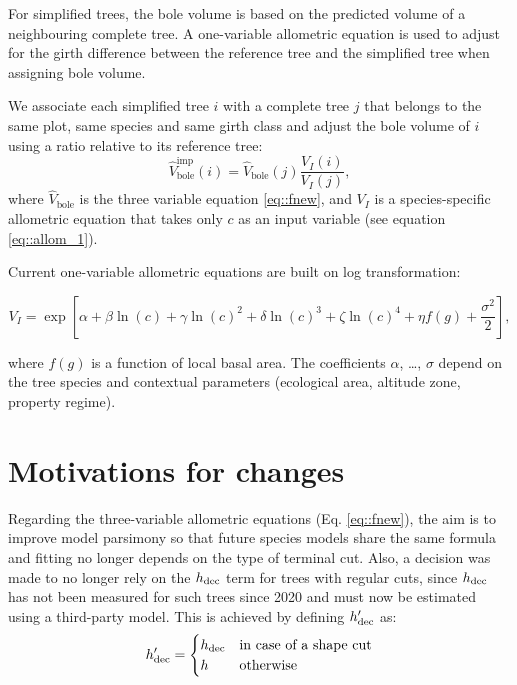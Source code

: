 For simplified trees, the bole volume is based on the predicted volume of a neighbouring complete tree. A one-variable allometric equation is used to adjust for the girth difference between the reference tree and the simplified tree when assigning bole volume.
\begin{tcolorbox}[breakable, title = Volume imputation]
We associate each simplified tree \( i \) with a complete tree \( j \) that belongs to the same plot, same species and same girth class and adjust the bole volume of \( i \) using a ratio relative to its reference tree:
	\begin{equation}
		\hat{V}_{\text{bole}}^{\text{imp}}(i) = \hat{V}_{\text{bole}}(j) \frac{V_{I}(i)}{V_{I}(j)},
		\label{eq::imputation}
	\end{equation}
	where \( \hat{V}_{\text{bole}} \) is the three variable equation \eqref{eq::fnew}, and \( V_{I} \) is a species-specific allometric equation that takes only \( c \) as an input variable (see equation \eqref{eq::allom_1}).
\end{tcolorbox}

Current one-variable allometric equations are built on log transformation:
\begin{fullwidth}
	\begin{equation}
		V_{I} = \exp \left[ \alpha + \beta \ln(c) + \gamma \ln(c)^2 + \delta \ln(c)^3 + \zeta \ln(c)^4 + \eta f(g) + \frac{\sigma^2}{2} \right],
		\label{eq::allom_1}
	\end{equation}
\end{fullwidth}
where \( f(g) \) is a function of local basal area. The coefficients \( \alpha \), \dots, \( \sigma \) depend on the tree species and contextual parameters (ecological area, altitude zone, property regime). 

\section{Motivations for changes}

Regarding the three-variable allometric equations (Eq. \eqref{eq::fnew}), the aim is to improve model parsimony so that future species models share the same formula and fitting no longer depends on the type of terminal cut. Also, a decision was made to no longer rely on the \( h_{\text{dec}} \) term for trees with regular cuts, since \( h_{\text{dec}} \) has not been measured for such trees since 2020 and must now be estimated using a third-party model. This is achieved by defining \( h_{\text{dec}}' \) as:
\[
	h_{\text{dec}}' =
	\begin{cases}
		h_{\text{dec}} & \text{in case of a shape cut} \\
		h & \text{otherwise}
	\end{cases}
\]

